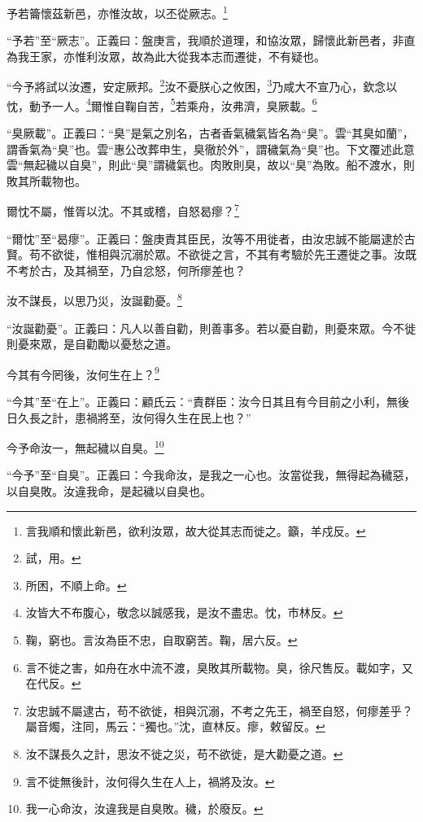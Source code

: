 予若籥懷茲新邑，亦惟汝故，以丕從厥志。\footnote{言我順和懷此新邑，欲利汝眾，故大從其志而徙之。籲，羊戍反。}

{\noindent\shu{}\fzkt “予若”至“厥志”。正義曰：盤庚言，我順於道理，和協汝眾，歸懷此新邑者，非直為我王家，亦惟利汝眾，故為此大從我本志而遷徙，不有疑也。 \par}

“今予將試以汝遷，安定厥邦。\footnote{試，用。}汝不憂朕心之攸困，\footnote{所困，不順上命。}乃咸大不宣乃心，欽念以忱，動予一人。\footnote{汝皆大不布腹心，敬念以誠感我，是汝不盡忠。忱，市林反。}爾惟自鞠自苦，\footnote{鞠，窮也。言汝為臣不忠，自取窮苦。鞠，居六反。}若乘舟，汝弗濟，臭厥載。\footnote{言不徙之害，如舟在水中流不渡，臭敗其所載物。臭，徐尺售反。載如字，又在代反。}

{\noindent\shu{}\fzkt “臭厥載”。正義曰：“臭”是氣之別名，古者香氣穢氣皆名為“臭”。雲“其臭如蘭”，謂香氣為“臭”也。雲“惠公改葬申生，臭徹於外”，謂穢氣為“臭”也。下文覆述此意雲“無起穢以自臭”，則此“臭”謂穢氣也。肉敗則臭，故以“臭”為敗。船不渡水，則敗其所載物也。 \par}

爾忱不屬，惟胥以沈。不其或稽，自怒曷瘳？\footnote{汝忠誠不屬逮古，苟不欲徙，相與沉溺，不考之先王，禍至自怒，何瘳差乎？屬音燭，注同，馬云：“獨也。”沈，直林反。瘳，敕留反。}

{\noindent\shu{}\fzkt “爾忱”至“曷瘳”。正義曰：盤庚責其臣民，汝等不用徙者，由汝忠誠不能屬逮於古賢。苟不欲徙，惟相與沉溺於眾。不欲徙之言，不其有考驗於先王遷徙之事。汝既不考於古，及其禍至，乃自忿怒，何所瘳差也？ \par}

汝不謀長，以思乃災，汝誕勸憂。\footnote{汝不謀長久之計，思汝不徙之災，苟不欲徙，是大勸憂之道。}

{\noindent\shu{}\fzkt “汝誕勸憂”。正義曰：凡人以善自勸，則善事多。若以憂自勸，則憂來眾。今不徙則憂來眾，是自勸勵以憂愁之道。 \par}

今其有今罔後，汝何生在上？\footnote{言不徙無後計，汝何得久生在人上，禍將及汝。}

{\noindent\shu{}\fzkt “今其”至“在上”。正義曰：顧氏云：“責群臣：汝今日其且有今目前之小利，無後日久長之計，患禍將至，汝何得久生在民上也？” \par}

今予命汝一，無起穢以自臭。\footnote{我一心命汝，汝違我是自臭敗。穢，於廢反。}

{\noindent\shu{}\fzkt “今予”至“自臭”。正義曰：今我命汝，是我之一心也。汝當從我，無得起為穢惡，以自臭敗。汝違我命，是起穢以自臭也。 \par}


